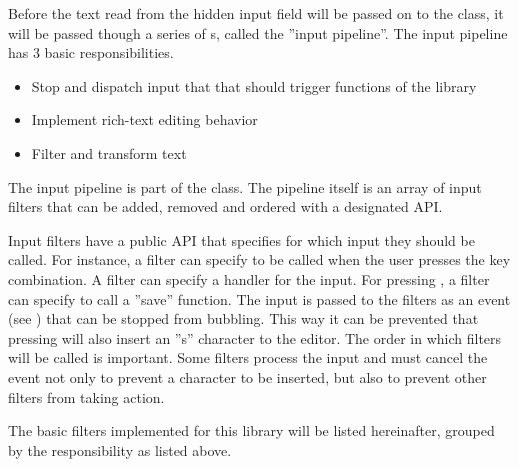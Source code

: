 Before the text read from the hidden input field will be passed on to the  class, it will be passed though a series of s, called the ''input pipeline''. The input pipeline has 3 basic responsibilities.

\begin{itemize}
\item Stop and dispatch input that that should trigger functions of the library
\item Implement rich-text editing behavior
\item Filter and transform text
\end{itemize}

The input pipeline is part of the  class. The pipeline itself is an array of input filters that can be added, removed and ordered with a designated API.

Input filters have a public API that specifies for which input they should be called. For instance, a filter can specify to be called when the user presses the  key combination. A filter can specify a handler for the input. For pressing , a filter can specify to call a ''save'' function. The input is passed to the filters as an event (see ) that can be stopped from bubbling. This way it can be prevented that pressing  will also insert an ''s'' character to the editor. The order in which filters will be called is important. Some filters process the input and must cancel the event not only to prevent a character to be inserted, but also to prevent other filters from taking action.



The basic filters implemented for this library will be listed hereinafter, grouped by the responsibility as listed above.


